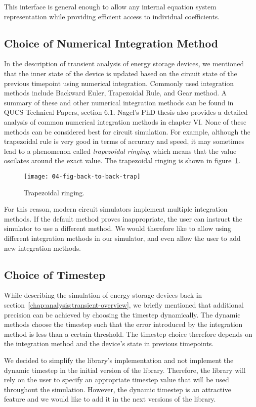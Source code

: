This interface is general enough to allow any internal equation system representation while providing efficient access to individual coefficients.

\subsection{Choice of Numerical Integration Method}
In the description of transient analysis of energy storage devices, we mentioned that the inner state of the device is updated based on the circuit state of the previous timepoint using numerical integration. Commonly used integration methods include Backward Euler, Trapezoidal Rule, and Gear method. A summary of these and other numerical integration methods can be found in QUCS Technical Papers, section 6.1. Nagel's PhD thesis also provides a detailed analysis of common numerical integration methods in chapter VI. None of these methods can be considered best for circuit simulation. For example, although the trapezoidal rule is very good in terms of accuracy and speed, it may sometimes lead to a phenomenon called \textit{trapezoidal ringing}, which means that the value oscilates around the exact value. The trapezoidal ringing is shown in figure~\ref{fig:trap-ringing}.

\begin{figure}[h]
	\centering
	\texttt{[image: 04-fig-back-to-back-trap]}
	\caption{Trapezoidal ringing.}
	\label{fig:trap-ringing}
\end{figure}

For this reason, modern circuit simulators implement multiple integration methods. If the default method proves inappropriate, the user can instruct the simulator to use a different method. We would therefore like to allow using different integration methods in our simulator, and even allow the user to add new integration methods.

\subsection{Choice of Timestep}
\label{chap:analysis-timestep}
While describing the simulation of energy storage devices back in section~\ref{chap:analysis:transient-overview}, we briefly mentioned that additional precision can be achieved by choosing the timestep dynamically. The dynamic methods choose the timestep such that the error introduced by the integration method is less than a certain threshold. The timestep choice therefore depends on the integration method and the device's state in previous timepoints.

We decided to simplify the library's implementation and not implement the dynamic timestep in the initial version of the library. Therefore, the library will rely on the user to specify an appropriate timestep value that will be used throughout the simulation. However, the dynamic timestep is an attractive feature and we would like to add it in the next versions of the library.
